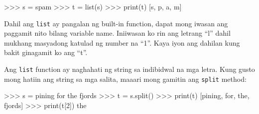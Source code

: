 \documentclass[10pt,]{book}
\newenvironment{Shaded}{}{}
\newcommand{\BuiltInTok}[1]{\textcolor[rgb]{0.00,0.50,0.00}{#1}}
\newcommand{\DecValTok}[1]{\textcolor[rgb]{0.25,0.63,0.44}{#1}}
\newcommand{\NormalTok}[1]{#1}
\newcommand{\OperatorTok}[1]{\textcolor[rgb]{0.40,0.40,0.40}{#1}}
\newcommand{\StringTok}[1]{\textcolor[rgb]{0.25,0.44,0.63}{#1}}
\begin{document}
 

\begin{Shaded}
\begin{Highlighting}[]
\OperatorTok{\textgreater{}\textgreater{}\textgreater{}}\NormalTok{ s }\OperatorTok{=} \StringTok{\textquotesingle{}spam\textquotesingle{}}
\OperatorTok{\textgreater{}\textgreater{}\textgreater{}}\NormalTok{ t }\OperatorTok{=} \BuiltInTok{list}\NormalTok{(s)}
\OperatorTok{\textgreater{}\textgreater{}\textgreater{}} \BuiltInTok{print}\NormalTok{(t)}
\NormalTok{[}\StringTok{\textquotesingle{}s\textquotesingle{}}\NormalTok{, }\StringTok{\textquotesingle{}p\textquotesingle{}}\NormalTok{, }\StringTok{\textquotesingle{}a\textquotesingle{}}\NormalTok{, }\StringTok{\textquotesingle{}m\textquotesingle{}}\NormalTok{]}
\end{Highlighting}
\end{Shaded}

Dahil ang \texttt{list} ay pangalan ng built-in function, dapat mong
iwasan ang paggamit nito bilang variable name. Iniiwasan ko rin ang
letrang ``l'' dahil mukhang masyadong katulad ng number na ``1''. Kaya
iyon ang dahilan kung bakit ginagamit ko ang ``t''.

Ang \texttt{list} function ay naghahati ng string sa indibidwal na mga
letra. Kung gusto mong hatiin ang string sa mga salita, maaari mong
gamitin ang \texttt{split} method:

 

\begin{Shaded}
\begin{Highlighting}[]
\OperatorTok{\textgreater{}\textgreater{}\textgreater{}}\NormalTok{ s }\OperatorTok{=} \StringTok{\textquotesingle{}pining for the fjords\textquotesingle{}}
\OperatorTok{\textgreater{}\textgreater{}\textgreater{}}\NormalTok{ t }\OperatorTok{=}\NormalTok{ s.split()}
\OperatorTok{\textgreater{}\textgreater{}\textgreater{}} \BuiltInTok{print}\NormalTok{(t)}
\NormalTok{[}\StringTok{\textquotesingle{}pining\textquotesingle{}}\NormalTok{, }\StringTok{\textquotesingle{}for\textquotesingle{}}\NormalTok{, }\StringTok{\textquotesingle{}the\textquotesingle{}}\NormalTok{, }\StringTok{\textquotesingle{}fjords\textquotesingle{}}\NormalTok{]}
\OperatorTok{\textgreater{}\textgreater{}\textgreater{}} \BuiltInTok{print}\NormalTok{(t[}\DecValTok{2}\NormalTok{])}
\NormalTok{the}
\end{Highlighting}
\end{Shaded}
\end{document}
